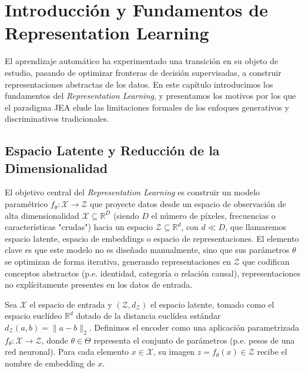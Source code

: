 \chapter{Introducción y Fundamentos de Representation Learning}
\label{cap:intro}

El aprendizaje automático ha experimentado una transición en su objeto de estudio, pasando de optimizar fronteras de decisión supervisadas, a construir representaciones abstractas de los datos. En este capítulo introducimos los fundamentos del \textit{Representation Learning}, y presentamos los motivos por los que el paradigma JEA elude las limitaciones formales de los enfoques generativos y discriminativos tradicionales.

\section{Espacio Latente y Reducción de la Dimensionalidad}
\label{sec:espacio_latente}

El objetivo central del \textit{Representation Learning} es construir un modelo paramétrico $f_\theta: \mathcal{X} \to \mathcal{Z}$ que proyecte datos desde un espacio de observación de alta dimensionalidad $\mathcal{X} \subseteq \mathbb{R}^D$ (siendo $D$ el número de píxeles, frecuencias o características "crudas") hacia un espacio $\mathcal{Z} \subseteq \mathbb{R}^d$, con $d \ll D$, que llamaremos espacio latente, espacio de embeddings o espacio de representaciones. El elemento clave es que este modelo no es diseñado manualmente, sino que sus parámetros $\theta$ se optimizan de forma iterativa, generando representaciones en $\mathcal{Z}$ que codifican conceptos abstractos (p.e. identidad, categoría o relación causal), representaciones no explícitamente presentes en los datos de entrada.

\begin{definition}
Sea $\mathcal{X}$ el espacio de entrada y $(\mathcal{Z}, d_{\mathcal{Z}})$ el espacio latente, tomado como el espacio euclídeo $\mathbb{R}^d$ dotado de la distancia euclídea estándar $d_{\mathcal{Z}}(a,b) = \|a - b\|_2$. Definimos el encoder como una aplicación parametrizada $f_{\theta}: \mathcal{X} \to \mathcal{Z}$, donde $\theta \in \Theta$ representa el conjunto de parámetros (p.e. pesos de una red neuronal). Para cada elemento $x \in \mathcal{X}$, su imagen $z = f_{\theta}(x) \in \mathcal{Z}$ recibe el nombre de embedding de $x$.
\end{definition}

